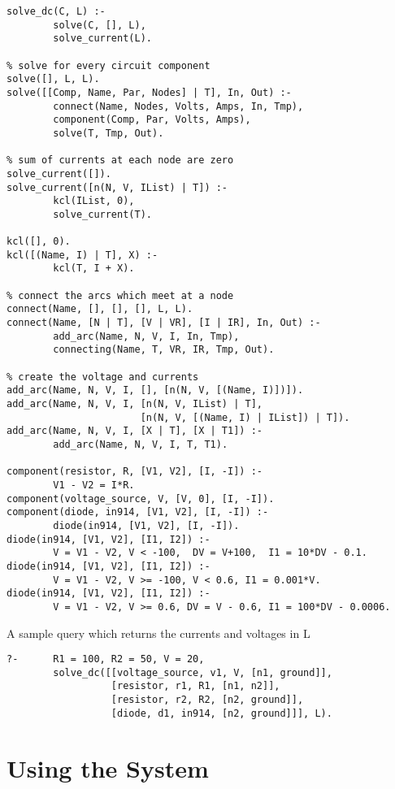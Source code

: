 \begin{verbatim}
solve_dc(C, L) :-
        solve(C, [], L),
        solve_current(L).

% solve for every circuit component
solve([], L, L).
solve([[Comp, Name, Par, Nodes] | T], In, Out) :-
        connect(Name, Nodes, Volts, Amps, In, Tmp),
        component(Comp, Par, Volts, Amps),
        solve(T, Tmp, Out).

% sum of currents at each node are zero
solve_current([]).              
solve_current([n(N, V, IList) | T]) :-
        kcl(IList, 0),
        solve_current(T).

kcl([], 0).
kcl([(Name, I) | T], X) :-
        kcl(T, I + X).

% connect the arcs which meet at a node
connect(Name, [], [], [], L, L).      
connect(Name, [N | T], [V | VR], [I | IR], In, Out) :-
        add_arc(Name, N, V, I, In, Tmp),
        connecting(Name, T, VR, IR, Tmp, Out).

% create the voltage and currents
add_arc(Name, N, V, I, [], [n(N, V, [(Name, I)])]). 
add_arc(Name, N, V, I, [n(N, V, IList) | T], 
                       [n(N, V, [(Name, I) | IList]) | T]).
add_arc(Name, N, V, I, [X | T], [X | T1]) :- 
        add_arc(Name, N, V, I, T, T1).

component(resistor, R, [V1, V2], [I, -I]) :-
        V1 - V2 = I*R.
component(voltage_source, V, [V, 0], [I, -I]).
component(diode, in914, [V1, V2], [I, -I]) :-
        diode(in914, [V1, V2], [I, -I]).
diode(in914, [V1, V2], [I1, I2]) :-
        V = V1 - V2, V < -100,  DV = V+100,  I1 = 10*DV - 0.1.
diode(in914, [V1, V2], [I1, I2]) :-
        V = V1 - V2, V >= -100, V < 0.6, I1 = 0.001*V.
diode(in914, [V1, V2], [I1, I2]) :-
        V = V1 - V2, V >= 0.6, DV = V - 0.6, I1 = 100*DV - 0.0006.
\end{verbatim}

A sample query which returns the currents and voltages in L

\begin{verbatim}
?-      R1 = 100, R2 = 50, V = 20,
        solve_dc([[voltage_source, v1, V, [n1, ground]], 
                  [resistor, r1, R1, [n1, n2]],
                  [resistor, r2, R2, [n2, ground]], 
                  [diode, d1, in914, [n2, ground]]], L).
\end{verbatim}

\chapter{Using the System} \label{chap:system}

